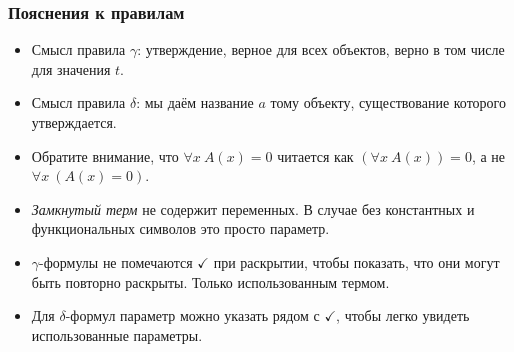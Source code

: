 \documentclass[10pt]{beamer}
\begin{document}
\begin{frame}
\frametitle{Пояснения к правилам}
\begin{itemize}
    \item Смысл правила $\gamma$: утверждение, верное для всех объектов, верно в том числе для значения $t$.
    \item Смысл правила $\delta$: мы даём название $a$ тому объекту, существование которого утверждается. \pause 
    \item Обратите внимание, что $\forall x ~ A(x) = 0$ читается как \pause $(\forall x ~ A(x)) = 0$, а не $\forall x ~ (A(x) = 0)$. \pause
    \item \emph{Замкнутый терм} не содержит переменных. В случае без константных и функциональных символов это просто параметр. \pause
    \item $\gamma$-формулы не помечаются $\checkmark$ при раскрытии, чтобы показать, что они могут быть повторно раскрыты. Только использованным термом.
    \item Для $\delta$-формул параметр можно указать рядом с $\checkmark$, чтобы легко увидеть использованные параметры.
\end{itemize}
\end{frame}
\end{document}
